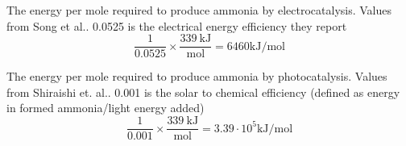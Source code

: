 \documentclass[journal=jacsat,manuscript=article]{achemso}
\begin{document}
The energy per mole required to produce ammonia by electrocatalysis. Values from Song et al.\cite{Song_2018}. 0.0525 is the electrical energy efficiency they report
\begin{equation}
\mathrm{\frac{1}{0.0525} \times \frac{339 \: kJ}{mol} = 6460 kJ/mol
}
\end{equation}

The energy per mole required to produce ammonia by photocatalysis. Values from Shiraishi et. al.\cite{Shiraishi_2018}. 0.001 is the solar to chemical efficiency (defined as energy in formed ammonia/light energy added)
\begin{equation}
\mathrm{\frac{1}{0.001} \times \frac{339 \: kJ}{mol} = 3.39 \cdot 10^5 kJ/mol
}

\end{equation}


\pagebreak

\end{document}
